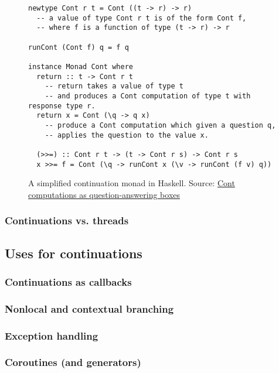 \documentclass[]{article}
\begin{document}
\begin{figure}[h]
  \centering
\begin{verbatim}
newtype Cont r t = Cont ((t -> r) -> r)
  -- a value of type Cont r t is of the form Cont f,
  -- where f is a function of type (t -> r) -> r

runCont (Cont f) q = f q

instance Monad Cont where
  return :: t -> Cont r t
    -- return takes a value of type t
    -- and produces a Cont computation of type t with response type r.
  return x = Cont (\q -> q x)
    -- produce a Cont computation which given a question q,
    -- applies the question to the value x.

  (>>=) :: Cont r t -> (t -> Cont r s) -> Cont r s
  x >>= f = Cont (\q -> runCont x (\v -> runCont (f v) q))
\end{verbatim}
  \caption{A simplified continuation monad in Haskell. Source: \href{https://wiki.haskell.org/Cont_computations_as_question-answering_boxes}{Cont computations as question-answering boxes}}
  \label{fig:mona}
\end{figure}

\subsubsection{Continuations vs. threads}
\label{sec:vsth}

\subsection{Uses for continuations}
\label{sec:uses}

\subsubsection{Continuations as callbacks}
\label{sec:cacb}

\subsubsection{Nonlocal and contextual branching}
\label{sec:nonl}

\subsubsection{Exception handling}
\label{sec:excp}

\subsubsection{Coroutines (and generators)}
\label{sec:coro}
\end{document}
